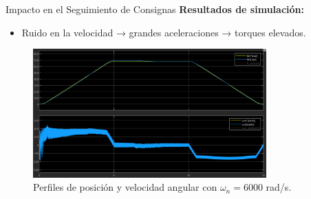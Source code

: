 \documentclass[12pt]{beamer}
\begin{document}
\begin{frame}{Impacto en el Seguimiento de Consignas}
    \textbf{Resultados de simulación:}
    \begin{itemize}
        \item Ruido en la velocidad → grandes aceleraciones → torques elevados.
    \end{itemize}
    
    \begin{figure}
        \centering
        \includegraphics[width=0.8\textwidth]{Imagenes/Posicion_Velocidad_ModuladorTNL.png}
        \caption{Perfiles de posición y velocidad angular con \(\omega_n = 6000\) rad/s.}
    \end{figure}
\end{frame}
\end{document}
